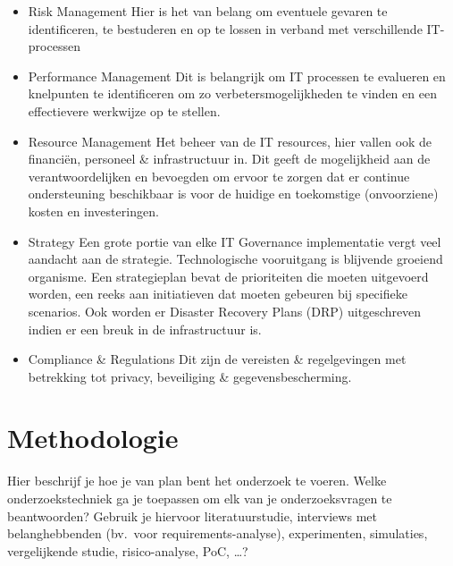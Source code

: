 \begin{itemize}
  \item Risk Management
  Hier is het van belang om eventuele gevaren te identificeren, te bestuderen en op te lossen in verband met verschillende IT-processen
  \item Performance Management
  Dit is belangrijk om IT processen te evalueren en knelpunten te identificeren om zo verbetersmogelijkheden te vinden en een effectievere werkwijze op te stellen.
  \item Resource Management
  Het beheer van de IT resources, hier vallen ook de financiën, personeel \& infrastructuur in. Dit geeft de mogelijkheid aan de verantwoordelijken en bevoegden om ervoor te zorgen dat er continue ondersteuning beschikbaar is voor de huidige en toekomstige (onvoorziene) kosten en investeringen.
  \item Strategy
  Een grote portie van elke IT Governance implementatie vergt veel aandacht aan de strategie. Technologische vooruitgang is blijvende groeiend organisme. Een strategieplan bevat de prioriteiten die moeten uitgevoerd worden, een reeks aan initiatieven dat moeten gebeuren bij specifieke scenarios. Ook worden er Disaster Recovery Plans (DRP) uitgeschreven indien er een breuk in de infrastructuur is.
  \item Compliance \& Regulations
  Dit zijn de vereisten \& regelgevingen met betrekking tot privacy, beveiliging \& gegevensbescherming.
\end{itemize}




\section{Methodologie}%
\label{sec:methodologie}

Hier beschrijf je hoe je van plan bent het onderzoek te voeren. Welke onderzoekstechniek ga je toepassen om elk van je onderzoeksvragen te beantwoorden? Gebruik je hiervoor literatuurstudie, interviews met belanghebbenden (bv.~voor requirements-analyse), experimenten, simulaties, vergelijkende studie, risico-analyse, PoC, \ldots?

